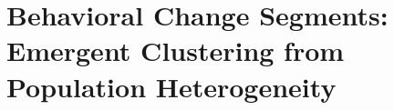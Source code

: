 %
%
%
%
%
%

%
%
%
%
%


\chapter{Behavioral Change Segments: Emergent Clustering from Population Heterogeneity}
\label{ch:bcs}

